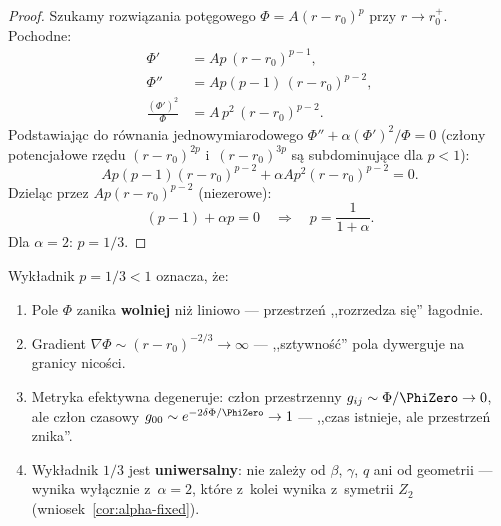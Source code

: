 \begin{proof}
Szukamy rozwi\k{a}zania pot\k{e}gowego $\Phi = A(r - r_0)^p$
przy $r \to r_0^+$. Pochodne:
\begin{align}
    \Phi' &= Ap\,(r-r_0)^{p-1}, \\
    \Phi'' &= Ap(p-1)\,(r-r_0)^{p-2}, \\
    \frac{(\Phi')^2}{\Phi} &= A\,p^2\,(r-r_0)^{p-2}.
\end{align}
Podstawiaj\k{a}c do r\'ownania jednowymiarodowego
$\Phi'' + \alpha(\Phi')^2/\Phi = 0$ (cz\l{}ony
potencja\l{}owe rz\k{e}du $(r-r_0)^{2p}$ i~$(r-r_0)^{3p}$
s\k{a} subdominuj\k{a}ce dla $p < 1$):
\begin{equation}
    Ap(p-1)(r-r_0)^{p-2} + \alpha A p^2(r-r_0)^{p-2} = 0.
\end{equation}
Dziel\k{a}c przez $Ap(r-r_0)^{p-2}$ (niezerowe):
\begin{equation}
    (p-1) + \alpha p = 0
    \quad\Longrightarrow\quad
    p = \frac{1}{1+\alpha}.
\end{equation}
Dla $\alpha = 2$: $p = 1/3$.
\end{proof}

\begin{remark}%
\label{rem:exponent-interpretation}
Wyk\l{}adnik $p = 1/3 < 1$ oznacza, \.ze:
\begin{enumerate}[nosep]
  \item Pole $\Phi$ zanika \textbf{wolniej} ni\.z liniowo
    --- przestrze\'n ,,rozrzedza si\k{e}'' \l{}agodnie.
  \item Gradient $\nabla\Phi \sim (r-r_0)^{-2/3} \to \infty$
    --- ,,sztywno\'s\'c'' pola dywerguje na granicy nico\'sci.
  \item Metryka efektywna degeneruje: cz\l{}on przestrzenny
    $g_{ij} \sim \Phi/\PhiZero \to 0$, ale cz\l{}on czasowy
    $g_{00} \sim e^{-2\delta\Phi/\PhiZero} \to 1$ ---
    ,,czas istnieje, ale przestrze\'n znika''.
  \item Wyk\l{}adnik $1/3$ jest \textbf{uniwersalny}: nie
    zale\.zy od $\beta$, $\gamma$, $q$ ani od geometrii
    --- wynika wy\l{}\k{a}cznie z~$\alpha = 2$, kt\'ore
    z~kolei wynika z~symetrii $Z_2$
    (wniosek~\ref{cor:alpha-fixed}).
\end{enumerate}
\end{remark}

